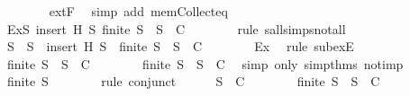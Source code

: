 \begin{isabellebody}
\ \ \ \ \ \ \isamarkupfalse%
\ extF\ \isamarkupfalse%
\ {\isacharparenleft}simp\ add{\isacharcolon}\ mem{\isacharunderscore}Collect{\isacharunderscore}eq{\isacharparenright}\isanewline
\ \ \ \ \isamarkupfalse%
\ \isamarkupfalse%
\ Ex{}{\isacharcolon}{\isachardoublequoteopen}{\isasymexists}S{\isacharprime}{\isasymsubseteq}\ {\isacharparenleft}insert\ H\ S{\isacharparenright}{\isachardot}\ {\isasymnot}{\isacharparenleft}finite\ S{\isacharprime}\ {\isasymlongrightarrow}\ S{\isacharprime}\ {\isasymin}\ C{\isacharparenright}{\isachardoublequoteclose}\isanewline
\ \ \ \ \ \ \isamarkupfalse%
\ {\isacharparenleft}rule\ sall{\isacharunderscore}simps{\isacharunderscore}not{\isacharunderscore}all{\isacharparenright}\isanewline
\ \ \ \ \isamarkupfalse%
\ S{}\ \ {\isachardoublequoteopen}S{}\ {\isasymsubseteq}\ insert\ H\ S{\isachardoublequoteclose}\ \ {\isachardoublequoteopen}{\isasymnot}{\isacharparenleft}finite\ S{}\ {\isasymlongrightarrow}\ S{}\ {\isasymin}\ C{\isacharparenright}{\isachardoublequoteclose}\isanewline
\ \ \ \ \ \ \isamarkupfalse%
\ Ex{}\ \isamarkupfalse%
\ {\isacharparenleft}rule\ subexE{\isacharparenright}\isanewline
\ \ \ \ \isamarkupfalse%
\ {\isachardoublequoteopen}finite\ S{}\ {\isasymand}\ S{}\ {\isasymnotin}\ C{\isachardoublequoteclose}\isanewline
\ \ \ \ \ \ \isamarkupfalse%
\ {\isacartoucheopen}{\isasymnot}{\isacharparenleft}finite\ S{}\ {\isasymlongrightarrow}\ S{}\ {\isasymin}\ C{\isacharparenright}{\isacartoucheclose}\ \isamarkupfalse%
\ {\isacharparenleft}simp\ only{\isacharcolon}\ simp{\isacharunderscore}thms{\isacharparenleft}{}{\isacharcomma}{}{}{\isacharparenright}\ not{\isacharunderscore}imp{\isacharparenright}\isanewline
\ \ \ \ \isamarkupfalse%
\ \isamarkupfalse%
\ {\isachardoublequoteopen}finite\ S{}{\isachardoublequoteclose}\isanewline
\ \ \ \ \ \ \isamarkupfalse%
\ {\isacharparenleft}rule\ conjunct{}{\isacharparenright}\isanewline
\ \ \ \ \isamarkupfalse%
\ {\isachardoublequoteopen}S{}\ {\isasymnotin}\ C{\isachardoublequoteclose}\isanewline
\ \ \ \ \ \ \isamarkupfalse%
\ {\isacartoucheopen}finite\ S{}\ {\isasymand}\ S{}\ {\isasymnotin}\ C{\isacartoucheclose}\ \isamarkupfalse%

\end{isabellebody}
